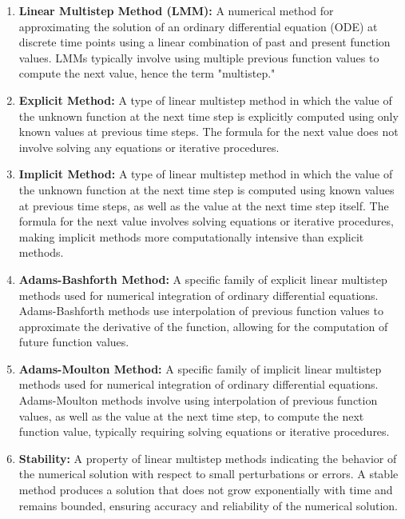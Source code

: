 \begin{enumerate}
  \item \textbf{Linear Multistep Method (LMM):} A numerical method for approximating the solution of an ordinary differential equation (ODE) at discrete time points using a linear combination of past and present function values. LMMs typically involve using multiple previous function values to compute the next value, hence the term "multistep."
    
    \item \textbf{Explicit Method:} A type of linear multistep method in which the value of the unknown function at the next time step is explicitly computed using only known values at previous time steps. The formula for the next value does not involve solving any equations or iterative procedures.
    
    \item \textbf{Implicit Method:} A type of linear multistep method in which the value of the unknown function at the next time step is computed using known values at previous time steps, as well as the value at the next time step itself. The formula for the next value involves solving equations or iterative procedures, making implicit methods more computationally intensive than explicit methods.
    
    \item \textbf{Adams-Bashforth Method:} A specific family of explicit linear multistep methods used for numerical integration of ordinary differential equations. Adams-Bashforth methods use interpolation of previous function values to approximate the derivative of the function, allowing for the computation of future function values.
    
    \item \textbf{Adams-Moulton Method:} A specific family of implicit linear multistep methods used for numerical integration of ordinary differential equations. Adams-Moulton methods involve using interpolation of previous function values, as well as the value at the next time step, to compute the next function value, typically requiring solving equations or iterative procedures.
    
    \item \textbf{Stability:} A property of linear multistep methods indicating the behavior of the numerical solution with respect to small perturbations or errors. A stable method produces a solution that does not grow exponentially with time and remains bounded, ensuring accuracy and reliability of the numerical solution.
    

\end{enumerate}
